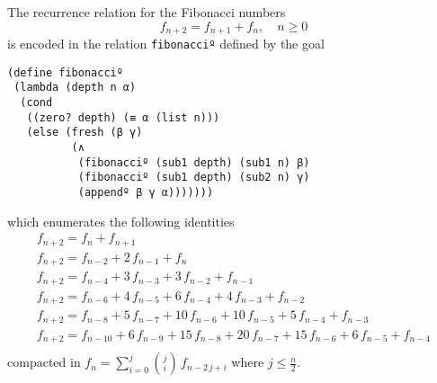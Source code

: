 \begin{example}
The recurrence relation for the Fibonacci numbers
\begin{displaymath}
f_{n+2} = f_{n+1} + f_{n}, \quad n \geq 0
\end{displaymath}
is encoded in the relation \verb|fibonacciº| defined by the goal
\begin{verbatim}
(define fibonacciº
 (lambda (depth n α)
  (cond
   ((zero? depth) (≡ α (list n)))
   (else (fresh (β γ)
          (∧
           (fibonacciº (sub1 depth) (sub1 n) β)
           (fibonacciº (sub1 depth) (sub2 n) γ)
           (appendº β γ α)))))))
\end{verbatim}
which enumerates the following identities
\begin{displaymath}
    \begin{array}{c}
      f_{n+2} = f_{n} + f_{n+1} \\
      f_{n+2} = f_{n-2} + 2\,f_{n-1} + f_{n}  \\
      f_{n+2} = f_{n-4} + 3\,f_{n-3} + 3\,f_{n-2} + f_{n-1} \\
      f_{n+2} = f_{n-6} + 4\,f_{n-5} + 6\,f_{n-4} + 4\,f_{n-3} + f_{n-2} \\
      f_{n+2} = f_{n-8} + 5\,f_{n-7} + 10\,f_{n-6} + 10\,f_{n-5} + 5\,f_{n-4} + f_{n-3} \\
      f_{n+2} = f_{n-10} + 6\,f_{n-9} +15\,f_{n-8} + 20\,f_{n-7} +15\,f_{n-6} + 6\,f_{n-5} + f_{n-4} \\
    \end{array}
\end{displaymath}
compacted in $\displaystyle f_{n} = \sum_{i=0}^{j}{{
{j}\choose{i} }\,f_{n-2\,j+i}}$ where
$\displaystyle j\leq \frac{n}{2}$.
\end{example}

